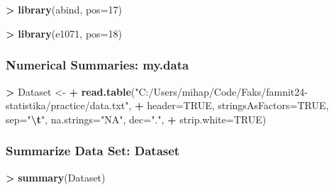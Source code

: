 \documentclass[
]{article}
\newenvironment{Shaded}{\begin{snugshade}}{\end{snugshade}}
\newcommand{\AttributeTok}[1]{\textcolor[rgb]{0.13,0.29,0.53}{#1}}
\newcommand{\ConstantTok}[1]{\textcolor[rgb]{0.56,0.35,0.01}{#1}}
\newcommand{\DecValTok}[1]{\textcolor[rgb]{0.00,0.00,0.81}{#1}}
\newcommand{\FunctionTok}[1]{\textcolor[rgb]{0.13,0.29,0.53}{\textbf{#1}}}
\newcommand{\NormalTok}[1]{#1}
\newcommand{\OtherTok}[1]{\textcolor[rgb]{0.56,0.35,0.01}{#1}}
\newcommand{\SpecialCharTok}[1]{\textcolor[rgb]{0.81,0.36,0.00}{\textbf{#1}}}
\newcommand{\StringTok}[1]{\textcolor[rgb]{0.31,0.60,0.02}{#1}}
\begin{document}
\begin{verbatim}
                    
                    
                    
                    
\end{verbatim}

\begin{Shaded}
\begin{Highlighting}[]
\SpecialCharTok{\textgreater{}} \FunctionTok{library}\NormalTok{(abind, }\AttributeTok{pos=}\DecValTok{17}\NormalTok{)}
\end{Highlighting}
\end{Shaded}

\begin{Shaded}
\begin{Highlighting}[]
\SpecialCharTok{\textgreater{}} \FunctionTok{library}\NormalTok{(e1071, }\AttributeTok{pos=}\DecValTok{18}\NormalTok{)}
\end{Highlighting}
\end{Shaded}

\subsubsection{Numerical Summaries:
my.data}\label{numerical-summaries-my.data}

\begin{Shaded}
\begin{Highlighting}[]
\SpecialCharTok{\textgreater{}}\NormalTok{ Dataset }\OtherTok{\textless{}{-}} 
\SpecialCharTok{+}   \FunctionTok{read.table}\NormalTok{(}\StringTok{"C:/Users/mihap/Code/Faks/famnit24{-}statistika/practice/data.txt"}\NormalTok{,}
\SpecialCharTok{+}    \AttributeTok{header=}\ConstantTok{TRUE}\NormalTok{, }\AttributeTok{stringsAsFactors=}\ConstantTok{TRUE}\NormalTok{, }\AttributeTok{sep=}\StringTok{"}\SpecialCharTok{\textbackslash{}t}\StringTok{"}\NormalTok{, }\AttributeTok{na.strings=}\StringTok{"NA"}\NormalTok{, }\AttributeTok{dec=}\StringTok{"."}\NormalTok{, }
\SpecialCharTok{+}   \AttributeTok{strip.white=}\ConstantTok{TRUE}\NormalTok{)}
\end{Highlighting}
\end{Shaded}

\subsubsection{Summarize Data Set:
Dataset}\label{summarize-data-set-dataset}

\begin{Shaded}
\begin{Highlighting}[]
\SpecialCharTok{\textgreater{}} \FunctionTok{summary}\NormalTok{(Dataset)}
\end{Highlighting}
\end{Shaded}
\end{document}
